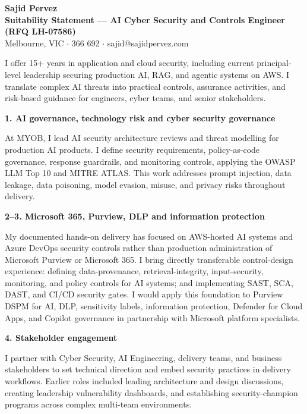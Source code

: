 \documentclass[a4paper,10pt]{article}
\begin{document}
\begin{center}
{\Large\bfseries Sajid Pervez}\\[2pt]
{\normalsize\bfseries Suitability Statement --- AI Cyber Security and Controls Engineer (RFQ LH-07586)}\\[3pt]
Melbourne, VIC \quad $\cdot$  366 692 \quad $\cdot$ \quad sajid@sajidpervez.com
\end{center}
\vspace{3pt}

I offer 15+ years in application and cloud security, including current principal-level leadership securing production AI, RAG, and agentic systems on AWS. I translate complex AI threats into practical controls, assurance activities, and risk-based guidance for engineers, cyber teams, and senior stakeholders.

\textbf{1. AI governance, technology risk and cyber security governance}\par
At MYOB, I lead AI security architecture reviews and threat modelling for production AI products. I define security requirements, policy-as-code governance, response guardrails, and monitoring controls, applying the OWASP LLM Top 10 and MITRE ATLAS. This work addresses prompt injection, data leakage, data poisoning, model evasion, misuse, and privacy risks throughout delivery.

\textbf{2--3. Microsoft 365, Purview, DLP and information protection}\par
My documented hands-on delivery has focused on AWS-hosted AI systems and Azure DevOps security controls rather than production administration of Microsoft Purview or Microsoft 365. I bring directly transferable control-design experience: defining data-provenance, retrieval-integrity, input-security, monitoring, and policy controls for AI systems; and implementing SAST, SCA, DAST, and CI/CD security gates. I would apply this foundation to Purview DSPM for AI, DLP, sensitivity labels, information protection, Defender for Cloud Apps, and Copilot governance in partnership with Microsoft platform specialists.

\textbf{4. Stakeholder engagement}\par
I partner with Cyber Security, AI Engineering, delivery teams, and business stakeholders to set technical direction and embed security practices in delivery workflows. Earlier roles included leading architecture and design discussions, creating leadership vulnerability dashboards, and establishing security-champion programs across complex multi-team environments.
\end{document}
